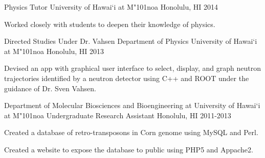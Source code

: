 \begin{cventries}
	\cventry
	{Physics Tutor}
	{University of Hawai`i at M{\char"101}noa}
	{Honolulu, HI}
	{2014}
	{
		\begin{cvitems}
			\item {Worked closely with students to deepen their knowledge of physics.}
		\end{cvitems}
	}
	\cventry
	{Directed Studies Under Dr. Vahsen}
	{Department of Physics University of Hawai`i at M{\char"101}noa}
	{Honolulu, HI}
	{2013}
	{
		\begin{cvitems}
			\item {Devised an app with graphical user interface to select, display, and graph neutron trajectories identified by a neutron detector using C++ and
				ROOT under the guidance of Dr. Sven Vahsen.}
		\end{cvitems}
	}
	\cventry
	{Department of Molecular Biosciences and Bioengineering at University of Hawai`i at M{\char"101}noa}
	{Undergraduate Research Assistant}
	{Honolulu, HI}
	{2011-2013}
	{
		\begin{cvitems}
			\item {Created a database of retro-transposons in Corn genome using MySQL and Perl.}
			\item {Created a website to expose the database to public using PHP5 and Appache2.}
		\end{cvitems}
	}
\end{cventries}

